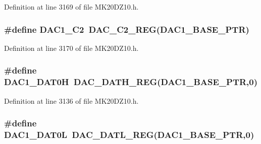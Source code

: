 Definition at line 3169 of file M\+K20\+D\+Z10.\+h.

\subsubsection[{\texorpdfstring{D\+A\+C1\+\_\+\+C2}{DAC1_C2}}]{\setlength{\rightskip}{0pt plus 5cm}\#define D\+A\+C1\+\_\+\+C2~{\bf D\+A\+C\+\_\+\+C2\+\_\+\+R\+EG}({\bf D\+A\+C1\+\_\+\+B\+A\+S\+E\+\_\+\+P\+TR})}\hypertarget{group___d_a_c___register___accessor___macros_ga6d25060cd417d1308e26e29540996d64}{}\label{group___d_a_c___register___accessor___macros_ga6d25060cd417d1308e26e29540996d64}


Definition at line 3170 of file M\+K20\+D\+Z10.\+h.

\subsubsection[{\texorpdfstring{D\+A\+C1\+\_\+\+D\+A\+T0H}{DAC1_DAT0H}}]{\setlength{\rightskip}{0pt plus 5cm}\#define D\+A\+C1\+\_\+\+D\+A\+T0H~{\bf D\+A\+C\+\_\+\+D\+A\+T\+H\+\_\+\+R\+EG}({\bf D\+A\+C1\+\_\+\+B\+A\+S\+E\+\_\+\+P\+TR},0)}\hypertarget{group___d_a_c___register___accessor___macros_gaf0871c1f28e99e5eaba4a4064f2b9d19}{}\label{group___d_a_c___register___accessor___macros_gaf0871c1f28e99e5eaba4a4064f2b9d19}


Definition at line 3136 of file M\+K20\+D\+Z10.\+h.

\subsubsection[{\texorpdfstring{D\+A\+C1\+\_\+\+D\+A\+T0L}{DAC1_DAT0L}}]{\setlength{\rightskip}{0pt plus 5cm}\#define D\+A\+C1\+\_\+\+D\+A\+T0L~{\bf D\+A\+C\+\_\+\+D\+A\+T\+L\+\_\+\+R\+EG}({\bf D\+A\+C1\+\_\+\+B\+A\+S\+E\+\_\+\+P\+TR},0)}\hypertarget{group___d_a_c___register___accessor___macros_ga2ec9b6717f771d3c3bb72078f7485720}{}\label{group___d_a_c___register___accessor___macros_ga2ec9b6717f771d3c3bb72078f7485720}


